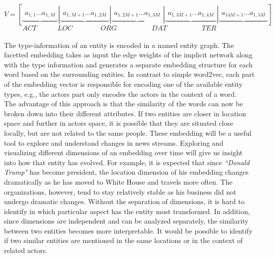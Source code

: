 \begin{equation}
V=\left[ \underbrace { \begin{matrix}{ a }_{ 1,1 } ... { a }_{ 1,M } \end{matrix} } |\underbrace { \begin{matrix}{ a }_{ 1,M+1 } ... { a }_{ 1,2M } \end{matrix} } |\underbrace { \begin{matrix}{ a }_{ 1,2M+1 } ... { a }_{ 1,3M } \end{matrix} } |\underbrace { \begin{matrix}{ a }_{ 1,3M+1 } ... { a }_{ 1,4M } \end{matrix} } |\underbrace { \begin{matrix}{ a }_{ 14M+1 } ... { a }_{ 1,5M } \end{matrix} }  \right] 
\label{eq:concat_vec}
\end{equation}
$$ \quad  ACT \quad  \qquad  LOC\qquad \qquad ORG\qquad \quad \qquad DAT\qquad \quad  \qquad  TER\qquad \qquad$$
\mathcenter
\\
The type-information of an entity is encoded in a named entity graph. The facetted embedding takes as input the edge weights of the implicit network along with the type information and generates a separate embedding structure for each word based on the surrounding entities. In contrast to simple word2vec, each part of the embedding vector is responsible for encoding one of the available entity types, e.g., the actors part only encodes the actors in the context of a word.\\
The advantage of this approach is that the similarity of the words can now be broken down into their different attributes. If two entities are closer in location space and further in actors space, it is possible that they are situated close locally, but are not related to the same people. These embedding will be a useful tool to explore and understand changes in news streams. Exploring and visualizing different dimensions of an embedding over time will give us insight into how that entity has evolved. For example, it is expected that since \emph{``Donald Trump"} has become president, the location dimension of his embedding changes dramatically as he has moved to White House and travels more often. The organizations, however, tend to stay relatively stable as his business did not undergo dramatic changes. Without the separation of dimensions, it is hard to identify in which particular aspect has the entity most transformed. In addition, since dimensions are independent and can be analyzed separately, the similarity between two entities becomes more interpretable. It would be possible to identify if two similar entities are mentioned in the same locations or in the context of related actors. \\

